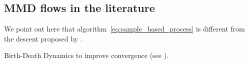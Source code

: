  






\subsection{MMD flows in the literature}

\begin{remark}
	We point out here that algorithm~\cref{eq:sample_based_process} is different from the descent proposed by \cite{mroueh2018regularized}. 
\end{remark}

\begin{remark}
	Birth-Death Dynamics to improve convergence (see \cite{rotskoff2019global}).
\end{remark}
